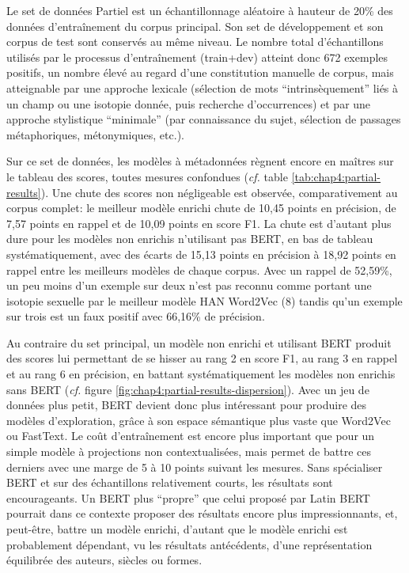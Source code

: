 Le set de données Partiel est un échantillonnage aléatoire à hauteur de 20\% des données d'entraînement du corpus principal. Son set de développement et son corpus de test sont conservés au même niveau. Le nombre total d'échantillons utilisés par le processus d'entraînement (train+dev) atteint donc 672 exemples positifs, un nombre élevé au regard d'une constitution manuelle de corpus, mais atteignable par une approche lexicale (sélection de mots ``intrinsèquement'' liés à un champ ou une isotopie donnée, puis recherche d'occurrences) et par une approche stylistique ``minimale'' (par connaissance du sujet, sélection de passages métaphoriques, métonymiques, etc.).

Sur ce set de données, les modèles à métadonnées règnent encore en maîtres sur le tableau des scores, toutes mesures confondues (\textit{cf.} table \ref{tab:chap4:partial-results}). Une chute des scores non négligeable est observée, comparativement au corpus complet: le meilleur modèle enrichi chute de 10,45 points en précision, de 7,57 points en rappel et de 10,09 points en score F1. La chute est d'autant plus dure pour les modèles non enrichis n'utilisant pas BERT, en bas de tableau systématiquement, avec des écarts de 15,13 points en précision à 18,92 points en rappel entre les meilleurs modèles de chaque corpus. Avec un rappel de 52,59\%, un peu moins d'un exemple sur deux n'est pas reconnu comme portant une isotopie sexuelle par le meilleur modèle HAN Word2Vec (8) tandis qu'un exemple sur trois est un faux positif avec 66,16\% de précision.


Au contraire du set principal, un modèle non enrichi et utilisant BERT produit des scores lui permettant de se hisser au rang 2 en score F1, au rang 3 en rappel et au rang 6 en précision, en battant systématiquement les modèles non enrichis sans BERT (\textit{cf.} figure \ref{fig:chap4:partial-results-dispersion}). Avec un jeu de données plus petit, BERT devient donc plus intéressant pour produire des modèles d'exploration, grâce à son espace sémantique plus vaste que Word2Vec ou FastText. Le coût d'entraînement est encore plus important que pour un simple modèle à projections non contextualisées, mais permet de battre ces derniers avec une marge de 5 à 10 points suivant les mesures. Sans spécialiser BERT et sur des échantillons relativement courts, les résultats sont encourageants. Un BERT plus ``propre'' que celui proposé par Latin BERT pourrait dans ce contexte proposer des résultats encore plus impressionnants, et, peut-être, battre un modèle enrichi, d'autant que le modèle enrichi est probablement dépendant, vu les résultats antécédents, d'une représentation équilibrée des auteurs, siècles ou formes.


